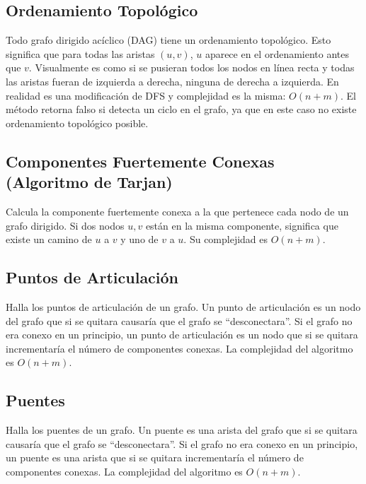 \documentclass{article}
\begin{document}
\begin{multicols}{2}
	\subsection{Ordenamiento Topológico}
	Todo grafo dirigido acíclico (DAG) tiene un ordenamiento topológico. Esto significa que para todas las aristas \( (u,v) \), \(u\) aparece en el ordenamiento antes que \(v\). Visualmente es como si se pusieran todos los nodos en línea recta y todas las aristas fueran de izquierda a derecha, ninguna de derecha a izquierda. En realidad es una modificación de DFS y complejidad es la misma: \( O(n + m) \). El método retorna falso si detecta un ciclo en el grafo, ya que en este caso no existe ordenamiento topológico posible.
	
	
	\subsection{Componentes Fuertemente Conexas (Algoritmo de Tarjan)}
	Calcula la componente fuertemente conexa a la que pertenece cada nodo de un grafo dirigido. Si dos nodos \( u, v \) están en la misma componente, significa que existe un camino de \( u \) a \( v \) y uno de \( v \) a \( u \). Su complejidad es \( O(n + m) \).
	
	
	\subsection{Puntos de Articulación}
	Halla los puntos de articulación de un grafo. Un punto de articulación es un nodo del grafo que si se quitara causaría que el grafo se ``desconectara''. Si el grafo no era conexo en un principio, un punto de articulación es un nodo que si se quitara incrementaría el número de componentes conexas. La complejidad del algoritmo es \( O(n + m) \).
	
	
	\subsection{Puentes}
	Halla los puentes de un grafo.  Un puente es una arista del grafo que si se quitara causaría que el grafo se ``desconectara''. Si el grafo no era conexo en un principio, un puente es una arista que si se quitara incrementaría el número de componentes conexas. La complejidad del algoritmo es \( O(n + m) \).
	
	

\end{multicols}
\end{document}
